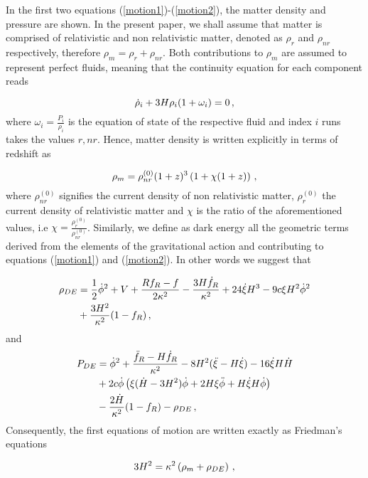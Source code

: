 \documentclass[aps,prd,twocolumn,groupedaddress,showpacs,nofootinbib,amssymb]{revtex4-2}
\begin{document}
In the first two equations (\ref{motion1})-(\ref{motion2}), the matter density and pressure are shown. In the present paper, we shall assume that matter is comprised of relativistic and non relativistic matter, denoted as $\rho_r$ and $\rho_{nr}$ respectively, therefore $\rho_m=\rho_r+\rho_{nr}$. Both contributions to $\rho_m$ are assumed to represent perfect fluids, meaning that the continuity equation for each component reads

\begin{equation}
\centering
\label{continuity}
\dot\rho_i+3H\rho_i(1+\omega_i)=0\, ,
\end{equation}
where $\omega_i=\frac{P_i}{\rho_i}$ is the equation of state of the respective fluid and index $i$ runs takes the values $r,nr$. Hence, matter density is written explicitly in terms of redshift as


\begin{equation}
\centering
\label{rhom}
\rho_m=\rho_{nr}^{(0)}(1+z)^3\left(1+\chi(1+z)\right)\, ,
\end{equation}
where $\rho_{nr}^{(0)}$ signifies the current density of non relativistic matter, $\rho_r^{(0)}$ the current density of relativistic matter and $\chi$ is the ratio of the aforementioned values, i.e $\chi=\frac{\rho_r^{(0)}}{\rho_{nr}^{(0)}}$. Similarly, we define as dark energy all the geometric terms derived from the elements of the gravitational action and contributing to equations (\ref{motion1}) and (\ref{motion2}). In other words we suggest that

\begin{align}
\centering
\label{rhoDE}
\rho_{DE}&=\frac{1}{2}\dot\phi^2+V+\frac{Rf_R-f}{2\kappa^2}-\frac{3H\dot f_R}{\kappa^2}+24\dot\xi H^3-9c\xi H^2\dot\phi^2\nonumber\\
&+\frac{3H^2}{\kappa^2}(1-f_R)\, ,
\end{align}
and
\begin{align}
\centering
\label{PDE}
P_{DE}&=\dot\phi^2+\frac{\ddot f_R-H\dot f_R}{\kappa^2}-8H^2(\ddot\xi-H\dot\xi)-16\dot\xi H\dot H\nonumber\\
&+2c\dot\phi\left(\xi(\dot H-3H^2)\dot\phi+2H\xi\ddot\phi+H\dot\xi H\dot\phi\right)\\\nonumber
&-\frac{2\dot H}{\kappa^2}(1-f_R)-\rho_{DE}\, ,
\end{align}
Consequently, the first equations of motion are written exactly as Friedman's equations

\begin{equation}
\centering
\label{motion4}
3H^2=\kappa^2\left(\rho_m+\rho_{DE}\right)\, ,
\end{equation}
\end{document}
